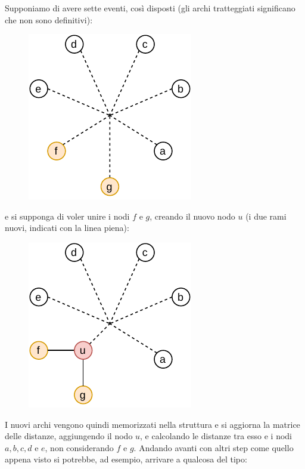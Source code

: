 \documentclass[a4paper,12pt, oneside]{book}
\begin{document}
Supponiamo di avere sette eventi, così disposti (gli archi tratteggiati
significano che non sono definitivi):
\begin{figure}[H]
  \centering
  \includegraphics[scale = 0.8]{img/nj.pdf}
\end{figure}
e si supponga di voler unire i nodi $f$ e $g$, creando il nuovo nodo $u$ (i due
rami nuovi, indicati con la linea piena):
\begin{figure}[H]
  \centering
  \includegraphics[scale = 0.8]{img/nj2.pdf}
\end{figure}
I nuovi archi vengono quindi memorizzati nella struttura e si aggiorna la
matrice delle distanze, aggiungendo il nodo $u$, e calcolando le distanze tra
esso e i nodi $a,b,c,d$ e $e$, non considerando $f$ e $g$. Andando avanti con
altri step come quello appena visto si potrebbe, ad esempio, arrivare a qualcosa
del tipo: 
\end{document}
